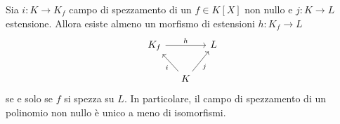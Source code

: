 
\begin{teor}\label{teor:UnicitaCampoDiSpezzamento}
Sia \(i : K \to K_f\) campo di spezzamento di un \(f \in K[X]\) non nullo e \(j : K \to L\) estensione. Allora esiste almeno un morfismo di estensioni \(h : K_f \to L\)
\[\begin{tikzcd}[column sep=small]
K_f \ar["h", rr] & & L \\
& K \ar["i", ul] \ar["j", ur, swap]
\end{tikzcd}\]
se e solo se \(f\) si spezza su \(L\). In particolare, il campo di spezzamento di un polinomio non nullo è unico a meno di isomorfismi. 
\end{teor}

